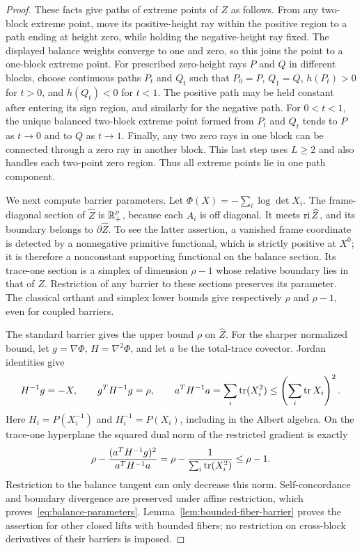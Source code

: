 \begin{proof}
These facts give paths of extreme points of $Z$ as follows.
From any two-block extreme point, move its positive-height ray within
the positive region to a path ending at height zero, while holding
the negative-height ray fixed.  The displayed balance weights converge
to one and zero, so this joins the point to a one-block extreme point.
For prescribed zero-height rays $P$ and $Q$ in different blocks,
choose continuous paths $P_t$ and $Q_t$ such that $P_0=P$, $Q_1=Q$,
$h(P_t)>0$ for $t>0$, and $h(Q_t)<0$ for $t<1$.
The positive path may be held constant after entering its sign region,
and similarly for the negative path.  For $0<t<1$, the unique balanced
two-block extreme point formed from $P_t$ and $Q_t$ tends to $P$ as
$t\to0$ and to $Q$ as $t\to1$.  Finally, any two zero
rays in one block can be connected through a zero ray in another
block.  This last step uses $L\geq2$ and also handles each two-point
zero region.  Thus all extreme points lie in one path component.

We next compute barrier parameters.  Let
$\Phi(X)=-\sum_i\log\det X_i$.  The frame-diagonal section of
$\widehat Z$ is $\mathbb R_+^\rho$, because each $A_i$ is off diagonal.
It meets $\operatorname{ri}\widehat Z$, and its boundary belongs to
$\partial\widehat Z$.  To see the latter assertion, a vanished frame
coordinate is detected by a nonnegative primitive functional, which
is strictly positive at $X^0$; it is therefore a nonconstant supporting
functional on the balance section.  Its trace-one section is a simplex
of dimension $\rho-1$ whose relative boundary lies in that of $Z$.
Restriction of any barrier to these sections preserves its parameter.
The classical orthant and simplex lower bounds
\cite[Section~2.3.4 and Proposition~2.3.6]{NN1994} give respectively
$\rho$ and $\rho-1$, even for coupled barriers.

The standard barrier gives the upper bound $\rho$ on $\widehat Z$.
For the sharper normalized bound, let $g=\nabla\Phi$, $H=\nabla^2\Phi$,
and let $a$ be the total-trace covector.  Jordan identities give
\[
 H^{-1}g=-X,\qquad g^TH^{-1}g=\rho,\qquad
 a^TH^{-1}a=\sum_i\operatorname{tr}(X_i^2)\leq\left(\sum_i\operatorname{tr} X_i\right)^2.
\]
Here $H_i=P(X_i^{-1})$ and $H_i^{-1}=P(X_i)$, including in the
Albert algebra.  On the trace-one hyperplane the squared dual norm
of the restricted gradient is exactly
\begin{equation}\label{eq:balance-gradient}
 \rho-\frac{(a^TH^{-1}g)^2}{a^TH^{-1}a}
 =\rho-\frac{1}{\sum_i\operatorname{tr}(X_i^2)}\leq\rho-1.
\end{equation}
Restriction to the balance tangent can only decrease this norm.
Self-concordance and boundary divergence are preserved under affine restriction,
which proves~\eqref{eq:balance-parameters}.
Lemma~\ref{lem:bounded-fiber-barrier} proves the assertion for other
closed lifts with bounded fibers; no restriction on cross-block
derivatives of their barriers is imposed.


\end{proof}
